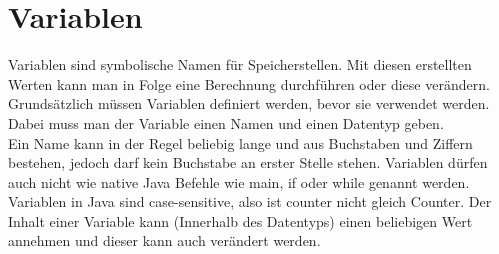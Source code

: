 \documentclass{article}
\begin{document}
	\section{Variablen}
	\label{sec:Datentypen}
	Variablen sind symbolische Namen für Speicherstellen. Mit diesen erstellten Werten kann man in Folge eine Berechnung durchführen oder diese verändern. \\
	Grundsätzlich müssen Variablen definiert werden, bevor sie verwendet werden. Dabei muss man der Variable einen Namen und einen Datentyp geben. \\
	Ein Name kann in der Regel beliebig lange und aus Buchstaben und Ziffern bestehen, jedoch darf kein Buchstabe an erster Stelle stehen. Variablen dürfen auch nicht wie native Java Befehle wie main, if oder while genannt werden. Variablen in Java sind case-sensitive, also ist counter nicht gleich Counter. Der Inhalt einer Variable kann (Innerhalb des Datentyps) einen beliebigen Wert annehmen und dieser kann auch verändert werden. \\
\end{document}
